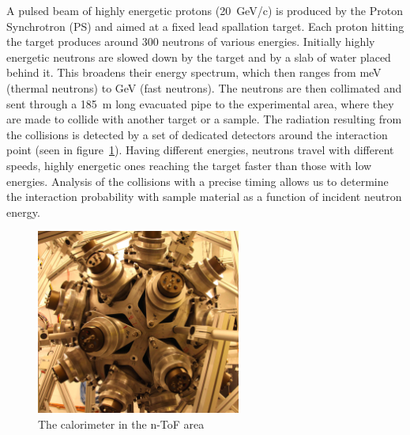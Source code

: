 \documentclass[twoside,12pt]{packages/mytustyle}  %
\begin{document}
A pulsed beam of highly energetic protons (20~GeV/c) is produced by the Proton Synchrotron (PS) and aimed at a fixed lead spallation target. Each proton hitting the target produces around 300 neutrons of various energies. Initially highly energetic neutrons are slowed down by the target and by a slab of water placed behind it. This broadens their energy spectrum, which then ranges from meV (thermal neutrons) to GeV (fast neutrons). The neutrons are then collimated and sent through a 185~m long evacuated pipe to the experimental area, where they are made to collide with another target or a sample. The radiation resulting from the collisions is detected by a set of dedicated detectors around the interaction point (seen in figure~\ref{fig:ntof}). Having different energies, neutrons travel with different speeds, highly energetic ones reaching the target faster than those with low energies. Analysis of the collisions with a precise timing allows us to determine the interaction probability with sample material as a function of incident neutron energy.
\begin{figure}[!t]
\centering
\includegraphics[width=0.6\textwidth]{pics/ntof}
\caption{The calorimeter in the n-ToF area \cite{Maximilien:1304589}}
\label{fig:ntof}
\end{figure}


\end{document}
